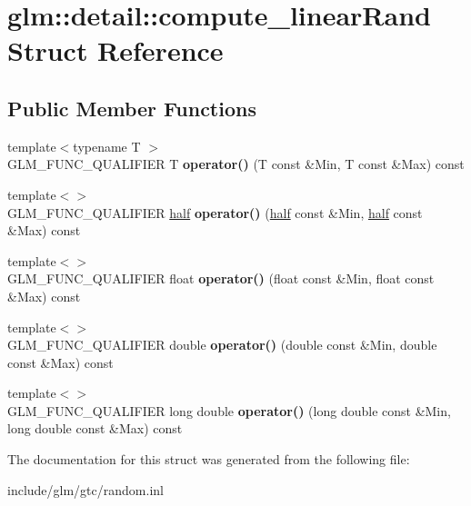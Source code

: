\hypertarget{structglm_1_1detail_1_1compute__linearRand}{\section{glm\-:\-:detail\-:\-:compute\-\_\-linear\-Rand \-Struct \-Reference}
\label{structglm_1_1detail_1_1compute__linearRand}
}
\subsection*{\-Public \-Member \-Functions}
\begin{DoxyCompactItemize}
\item 
\hypertarget{structglm_1_1detail_1_1compute__linearRand_ac852e16d66ba80ff5309238b3f494b99}{{\footnotesize template$<$typename T $>$ }\\\-G\-L\-M\-\_\-\-F\-U\-N\-C\-\_\-\-Q\-U\-A\-L\-I\-F\-I\-E\-R \-T {\bfseries operator()} (\-T const \&\-Min, \-T const \&\-Max) const }\label{structglm_1_1detail_1_1compute__linearRand_ac852e16d66ba80ff5309238b3f494b99}

\item 
\hypertarget{structglm_1_1detail_1_1compute__linearRand_a544b94bdfbdcf46c2689208e75f85612}{{\footnotesize template$<$$>$ }\\\-G\-L\-M\-\_\-\-F\-U\-N\-C\-\_\-\-Q\-U\-A\-L\-I\-F\-I\-E\-R \hyperlink{classglm_1_1detail_1_1half}{half} {\bfseries operator()} (\hyperlink{classglm_1_1detail_1_1half}{half} const \&\-Min, \hyperlink{classglm_1_1detail_1_1half}{half} const \&\-Max) const }\label{structglm_1_1detail_1_1compute__linearRand_a544b94bdfbdcf46c2689208e75f85612}

\item 
\hypertarget{structglm_1_1detail_1_1compute__linearRand_aeb6d4f603a9afa05544d65233064f2e9}{{\footnotesize template$<$$>$ }\\\-G\-L\-M\-\_\-\-F\-U\-N\-C\-\_\-\-Q\-U\-A\-L\-I\-F\-I\-E\-R float {\bfseries operator()} (float const \&\-Min, float const \&\-Max) const }\label{structglm_1_1detail_1_1compute__linearRand_aeb6d4f603a9afa05544d65233064f2e9}

\item 
\hypertarget{structglm_1_1detail_1_1compute__linearRand_a60dd37b36082f1a8dbfb8d34f0d5575c}{{\footnotesize template$<$$>$ }\\\-G\-L\-M\-\_\-\-F\-U\-N\-C\-\_\-\-Q\-U\-A\-L\-I\-F\-I\-E\-R double {\bfseries operator()} (double const \&\-Min, double const \&\-Max) const }\label{structglm_1_1detail_1_1compute__linearRand_a60dd37b36082f1a8dbfb8d34f0d5575c}

\item 
\hypertarget{structglm_1_1detail_1_1compute__linearRand_ab5433863c50ed60a1ce5ac941759428f}{{\footnotesize template$<$$>$ }\\\-G\-L\-M\-\_\-\-F\-U\-N\-C\-\_\-\-Q\-U\-A\-L\-I\-F\-I\-E\-R long double {\bfseries operator()} (long double const \&\-Min, long double const \&\-Max) const }\label{structglm_1_1detail_1_1compute__linearRand_ab5433863c50ed60a1ce5ac941759428f}

\end{DoxyCompactItemize}


\-The documentation for this struct was generated from the following file\-:\begin{DoxyCompactItemize}
\item 
include/glm/gtc/random.\-inl\end{DoxyCompactItemize}

